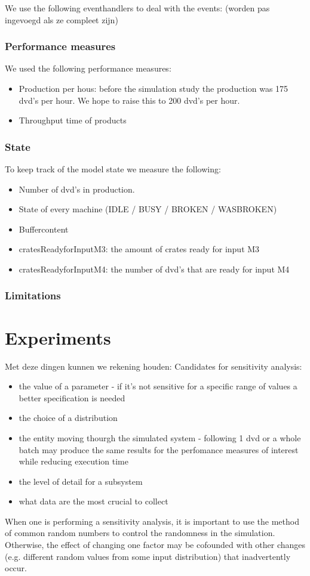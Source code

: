 \documentclass[11pt,a4paper]{article}
\begin{document}
We use the following eventhandlers to deal with the events: (worden pas ingevoegd als ze compleet zijn)



\subsubsection{Performance measures}
We used the following performance measures:
\begin{itemize}
\item Production per hous: before the simulation study the production was 175 dvd's per hour. We hope to raise this to 200 dvd's per hour. 
\item Throughput time of products 
\end {itemize}


\subsubsection{State}
To keep track of the model state we measure the following:
\begin{itemize}
\item Number of dvd's in production.
\item State of every machine (IDLE / BUSY / BROKEN / WASBROKEN)
\item Buffercontent
\item cratesReadyforInputM3: the amount of crates ready for input M3
\item cratesReadyforInputM4: the number of dvd's that are ready for input M4
\end{itemize}

\subsubsection{Limitations}

\section{Experiments}
Met deze dingen kunnen we rekening houden:
Candidates for sensitivity analysis:
\begin{itemize}
\item the value of a parameter - if it's not sensitive for a specific range of values a better specification is needed
\item  the choice of a distribution
\item  the entity moving thourgh the simulated system - following 1 dvd or a whole batch may produce the same results for the perfomance measures of interest while reducing execution time
\item the level of detail for a subsystem
\item  what data are the most crucial to collect 
\end{itemize}
When one is performing a sensitivity analysis, it is important to use the method of common random numbers to control the randomness in the simulation. Otherwise, the effect of changing one factor may be cofounded with other changes (e.g. different random values from some input distribution) that inadvertently occur.
\end{document}
